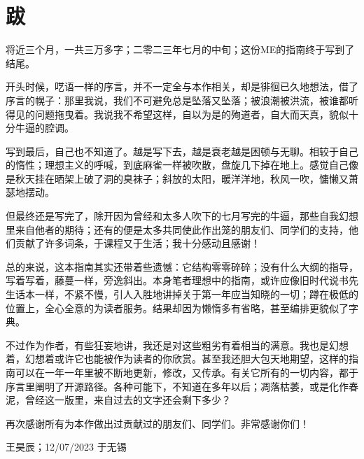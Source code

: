 \chapter{跋}
将近三个月，一共三万多字；二零二三年七月的中旬；这份ME的指南终于写到了结尾。

开头时候，呓语一样的序言，并不一定全与本作相关，却是徘徊已久地想法，借了序言的幌子：那里我说，我们不可避免总是坠落又坠落；被浪潮被洪流，被谁都听得见的问题拖曳着。我说我不希望这样，自以为是的殉道者，自大而天真，貌似十分牛逼的腔调。

写到最后，自己也不知道了。越是写下去，越是衰老越是困顿与无聊。相较于自己的惰性；理想主义的呼喊，到底麻雀一样被吹散，盘旋几下掉在地上。感觉自己像是秋天挂在晒架上破了洞的臭袜子；斜放的太阳，暖洋洋地，秋风一吹，慵懒又萧瑟地摆动。

但最终还是写完了，除开因为曾经和太多人吹下的七月写完的牛逼，那些自我幻想里来自他者的期待；还有的便是太多共同使此作出笼的朋友们、同学们的支持，他们贡献了许多词条，于课程又于生活；我十分感动且感谢！

总的来说，这本指南其实还带着些遗憾：它结构零零碎碎；没有什么大纲的指导，写着写着，藤蔓一样，旁逸斜出。本身笔者理想中的指南，或许应像旧时代说书先生话本一样，不紧不慢，引人入胜地讲掉关于第一年应当知晓的一切；蹲在极低的位置上，全心全意的为读者服务。结果却因为懒惰多有省略，甚至编排更貌似了字典。

不过作为作者，有些狂妄地讲，我还是对这些粗劣有着相当的满意。我也是幻想着，幻想着或许它也能被作为读者的你欣赏。甚至我还胆大包天地期望，这样的指南可以在一年一年里被不断地更新，修改，又传承。有关它所有的一切内容，都于序言里阐明了开源路径。各种可能下，不知道在多年以后；凋落枯萎，或是化作春泥，曾经这一版里，来自过去的文字还会剩下多少？

再次感谢所有为本作做出过贡献过的朋友们、同学们。非常感谢你们！

\begin{flushright}
王昊辰；12/07/2023 于无锡
\end{flushright}